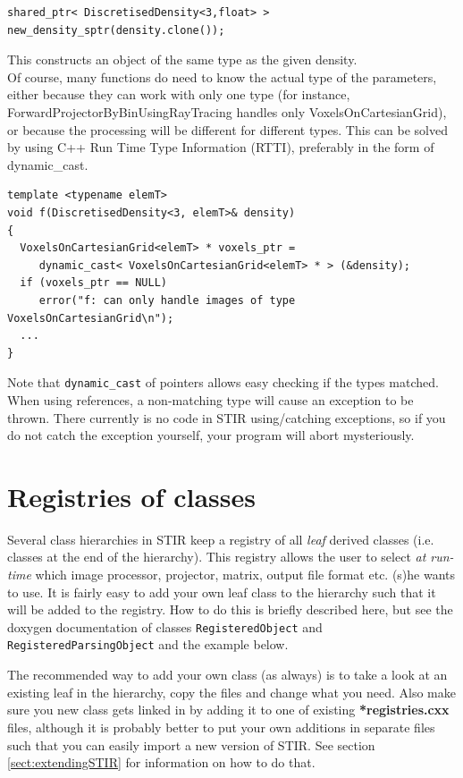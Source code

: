 \documentclass{article}
\begin{document}
\begin{verbatim}
shared_ptr< DiscretisedDensity<3,float> > new_density_sptr(density.clone());
\end{verbatim}

This constructs an object of the same type as the given density.\\
Of course, many functions do need to know the actual type of 
the parameters, either because they can work with only one type 
(for instance, ForwardProjectorByBinUsingRayTracing handles only 
VoxelsOnCartesianGrid), or because the processing will be different 
for different types. This can be solved by using C++ Run Time 
Type Information (RTTI), preferably in the form of dynamic\_cast.

\begin{verbatim}
template <typename elemT> 
void f(DiscretisedDensity<3, elemT>& density)
{
  VoxelsOnCartesianGrid<elemT> * voxels_ptr =
     dynamic_cast< VoxelsOnCartesianGrid<elemT> * > (&density);
  if (voxels_ptr == NULL)
     error("f: can only handle images of type VoxelsOnCartesianGrid\n");
  ...
}
\end{verbatim}


Note that \texttt{dynamic\_cast} of pointers allows easy checking if the 
types matched. When using references, a non-matching type will 
cause an exception to be thrown. There currently is no code in 
STIR using/catching exceptions, so if you do not catch the exception 
yourself, your program will abort mysteriously.


\section{
Registries of classes \label{sect:registries}}

Several class hierarchies in STIR keep a registry of all \textit{leaf} 
derived classes (i.e. classes at the end of the hierarchy). This 
registry allows the user to select \textit{at run-time} which image 
processor, projector, matrix, output file format etc. (s)he 
wants to use. It is fairly easy to add your own leaf class to 
the hierarchy such that it will be added to the registry. How 
to do this is briefly described here, but see the doxygen 
documentation of classes \texttt{RegisteredObject} and \texttt{RegisteredParsingObject}
and the example below. 

The recommended way to add your own class (as always) is to take 
a look at an existing leaf in the hierarchy, copy the files and 
change what you need. Also make sure you new class gets linked 
in by adding it to one of existing \textbf{*registries.cxx} files, although
it is probably better to put your own additions in separate files
such that you can easily import a new version of STIR. 
See section \ref{sect:extendingSTIR} for information on how to do that.
\end{document}
